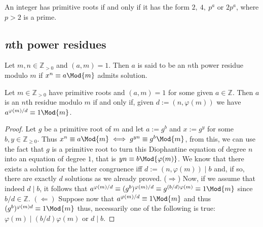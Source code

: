 \begin{proposition}
   An integer has primitive roots if and only if it has the form  \(2,\ 4,\
   p^a\) or \(2p^a\), where \(p > 2\) is a prime.
\end{proposition}

\subsection{\textit{n}th power residues}

\begin{definition}
   Let \(m, n \in \mathbb{Z}_{>0}\) and \((a, m) = 1\). Then \(a\) is said to be
   an \(n\)th power residue modulo \(m\) if  \(x^n \equiv a \Mod{m}\) admits
   solution.
\end{definition}

\begin{proposition}
   Let \(m \in \mathbb{Z}_{>0}\) have primitive roots and \((a, m) = 1\) for
   some given \(a \in \mathbb{Z}\). Then \(a\) is an  \(n \)th residue modulo
   \(m\) if and only if, given \(d := (n, \varphi(m))\) we have
   \(a^{\varphi(m)/d} \equiv 1 \Mod{m}\).
\end{proposition}

\begin{proof}
   Let \(g\) be a primitive root of \(m\) and let \(a := g^b\) and \(x := g^y\)
   for some \(b, y \in \mathbb{Z}_{\geqslant 0}\). Thus \(x^n \equiv a \Mod{m}
   \iff g^{yn} \equiv g^b \Mod{m}\), from this, we can use the fact that \(g\)
   is a primitive root to turn this Diophantine equation of degree \(n\) into
   an equation of degree \(1\), that is \(y n \equiv b \Mod{\varphi(m)}\).
   We know that there exists a solution for the latter congruence iff  \(d :=
   (n, \varphi(m)) \mid b\) and, if so, there are exactly \(d\) solutions as we
   already proved. (\(\Rightarrow\)) Now, if we assume that indeed \(d \mid b\),
   it follows that \(a^{\varphi(m)/d} \equiv (g^{b})^{\varphi(m)/d} \equiv
   g^{(b/d)\varphi(m)} \equiv 1 \Mod{m}\) since \(b/d \in \mathbb{Z}\).
   \((\Leftarrow)\) Suppose now that \(a^{\varphi(m)/d} \equiv 1 \Mod{m}\) and
   thus \((g^b)^{\varphi(m)d} \equiv 1 \Mod{m}\) thus, necessarily one of the
   following is true: \(\varphi(m) \mid (b/d)\varphi(m)\) or \(d \mid b\).
\end{proof}

